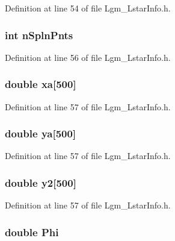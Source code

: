 Definition at line 54 of file Lgm\_\-LstarInfo.h.\hypertarget{struct_lgm___lstar_info_11528df252ee43e0e82ac6490020181f}{
\subsubsection[{nSplnPnts}]{\setlength{\rightskip}{0pt plus 5cm}int {\bf nSplnPnts}}}
\label{struct_lgm___lstar_info_11528df252ee43e0e82ac6490020181f}




Definition at line 56 of file Lgm\_\-LstarInfo.h.\hypertarget{struct_lgm___lstar_info_501f2c063215b27203462b91f615f570}{
\subsubsection[{xa}]{\setlength{\rightskip}{0pt plus 5cm}double {\bf xa}\mbox{[}500\mbox{]}}}
\label{struct_lgm___lstar_info_501f2c063215b27203462b91f615f570}




Definition at line 57 of file Lgm\_\-LstarInfo.h.\hypertarget{struct_lgm___lstar_info_2186b66c32c372f89e9cd85d4e0e5bea}{
\subsubsection[{ya}]{\setlength{\rightskip}{0pt plus 5cm}double {\bf ya}\mbox{[}500\mbox{]}}}
\label{struct_lgm___lstar_info_2186b66c32c372f89e9cd85d4e0e5bea}




Definition at line 57 of file Lgm\_\-LstarInfo.h.\hypertarget{struct_lgm___lstar_info_4e6e2ef6cbd430bce10cbd07a1e6c045}{
\subsubsection[{y2}]{\setlength{\rightskip}{0pt plus 5cm}double {\bf y2}\mbox{[}500\mbox{]}}}
\label{struct_lgm___lstar_info_4e6e2ef6cbd430bce10cbd07a1e6c045}




Definition at line 57 of file Lgm\_\-LstarInfo.h.\hypertarget{struct_lgm___lstar_info_0701272ef4e36f8d410e1a99161361fe}{
\subsubsection[{Phi}]{\setlength{\rightskip}{0pt plus 5cm}double {\bf Phi}}}
\label{struct_lgm___lstar_info_0701272ef4e36f8d410e1a99161361fe}




